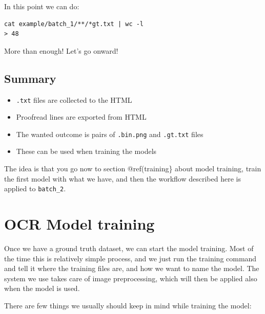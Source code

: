\documentclass[]{book}
\providecommand{\tightlist}{%
  \setlength{\itemsep}{0pt}\setlength{\parskip}{0pt}}
\begin{document}
In this point we can do:

\begin{verbatim}
cat example/batch_1/**/*gt.txt | wc -l
> 48
\end{verbatim}

More than enough! Let's go onward!

\hypertarget{summary}{%
\section{Summary}\label{summary}}

\begin{itemize}
\tightlist
\item
  \texttt{.txt} files are collected to the HTML
\item
  Proofread lines are exported from HTML
\item
  The wanted outcome is pairs of \texttt{.bin.png} and \texttt{.gt.txt} files
\item
  These can be used when training the models
\end{itemize}

The idea is that you go now to section @ref(training\} about model training, train the first model with what we have, and then the workflow described here is applied to \texttt{batch\_2}.

\hypertarget{training}{%
\chapter{OCR Model training}\label{training}}

Once we have a ground truth dataset, we can start the model training.
Most of the time this is relatively simple process, and we just run the training command and tell it where the training files are, and how we want to name the model. The system we use takes care of image preprocessing, which will then be applied also when the model is used.

There are few things we usually should keep in mind while training the model:
\end{document}
